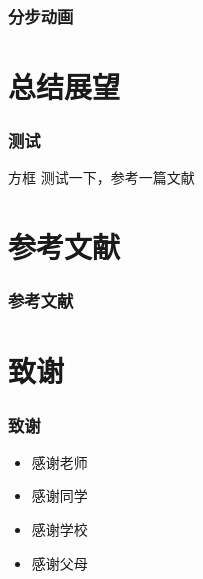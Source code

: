 \documentclass[14pt, AutoFakeBold]{ldr}
\begin{document}
\begin{frame}
  \frametitle{分步动画}




\end{frame}

\section{总结展望}

\begin{frame}
  \frametitle{测试}

  \begin{block}{方框}
    测试一下，参考一篇文献\cite{partl2016}
  \end{block}

\end{frame}


\section{参考文献}
\begin{frame}[t]
  \frametitle{参考文献}
  
  
  
\end{frame}

\section{致谢}

\begin{frame}[t]
\frametitle{致谢}
  \begin{itemize}
  \item 感谢老师
  \item 感谢同学
  \item 感谢学校
  \item 感谢父母
  \end{itemize}
\end{frame}
\end{document}
